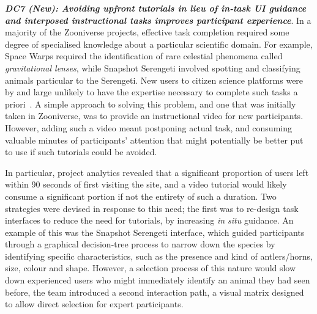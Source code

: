 \documentclass{sigchi}
\begin{document}
\begin{spacing}{0.97}


\textbf{\emph{DC7 (New): Avoiding upfront tutorials in lieu of in-task UI guidance and interposed instructional tasks improves participant experience}}. In a majority of the Zooniverse projects, effective task completion required some degree of specialised knowledge about a particular scientific domain. For example, Space Warps required the identification of rare celestial phenomena called \emph{gravitational lenses}, while Snapshot Serengeti involved spotting and classifying animals particular to the Serengeti. New users to citizen science platforms were by and large unlikely to have the expertise necessary to complete such tasks a priori~\cite{ockerman2000review}. A simple approach to solving this problem, and one that was initially taken in Zooniverse, was to provide an instructional video for new participants. However, adding such a video meant postponing actual task, and consuming valuable minutes of participants' attention that might potentially be better put to use if such tutorials could be avoided. 

In particular, project analytics revealed that a significant proportion of users left within 90 seconds of first visiting the site, and a video tutorial would likely consume a significant portion if not the entirety of such a duration. Two strategies were devised in response to this need; the first was to re-design task interfaces to reduce the need for tutorials, by increasing \emph{in situ} guidance. An example of this was the Snapshot Serengeti interface, which guided participants through a graphical decision-tree process to narrow down the species by identifying specific characteristics, such as the presence and kind of antlers/horns, size, colour and shape. However, a selection process of this nature would slow down experienced users who might immediately identify an animal they had seen before, the team introduced a second interaction path, a visual matrix designed to allow direct selection for expert participants. 


\end{spacing}
\end{document}
